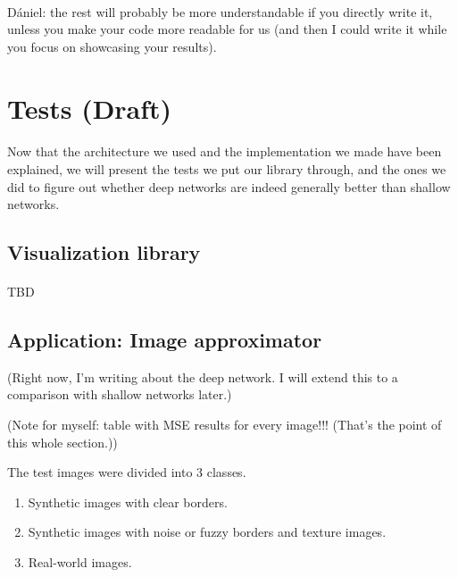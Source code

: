\documentclass[a4paper]{article}
\begin{document}
\paragraph{}D\'aniel: the rest will probably be more understandable if you directly write it, unless you make your code more readable for us (and then I could write it while you focus on showcasing your results).


\section{Tests (Draft)}
\paragraph{}Now that the architecture we used and the implementation we made have been explained, we will present the tests we put our library through, and the ones we did to figure out whether deep networks are indeed generally better than shallow networks.


\subsection{Visualization library}
\paragraph{}TBD

\subsection{Application: Image approximator}

(Right now, I'm writing about the deep network. I will extend this to a comparison with shallow networks later.)

(Note for myself: table with MSE results for every image!!! (That's the point of this whole section.))

The test images were divided into 3 classes.
\begin{enumerate}
\item Synthetic images with clear borders.
\item Synthetic images with noise or fuzzy borders and texture images.
\item Real-world images.
\end{enumerate}
\end{document}
